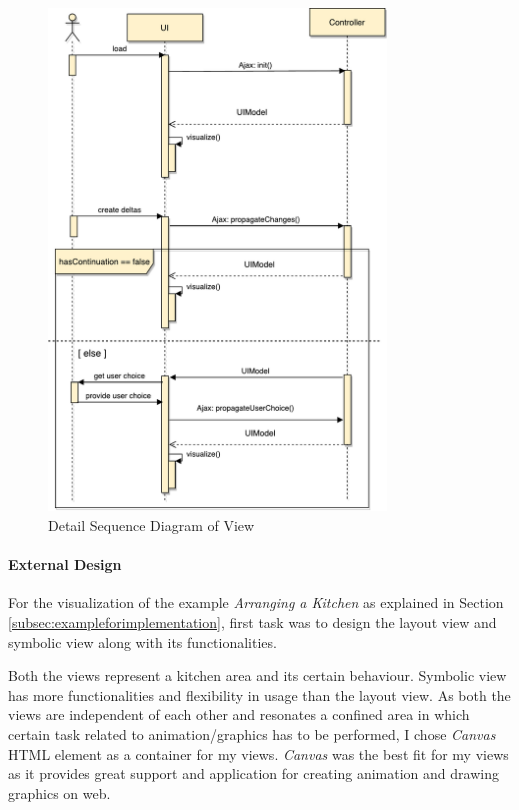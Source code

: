 \begin{figure}
	\includegraphics[width=0.8\textwidth]{figures/Sequence_Diagram-View}
	\caption{Detail Sequence Diagram of View}
	\label{fig:Sequence_Diagram-View}
\end{figure}

\paragraph{External Design}
For the visualization of the example \textit{Arranging a Kitchen} as explained in Section \ref{subsec:exampleforimplementation}, first task was to design the layout view and symbolic view along with its functionalities.

Both the views represent a kitchen area and its certain behaviour. Symbolic view has more functionalities and flexibility in usage than the layout view. As both the views are independent of each other and resonates a confined area in which certain task related to animation/graphics has to be performed, I chose \textit{Canvas} \cite{canvas} HTML element as a container for my views. \textit{Canvas} was the best fit for my views as it provides great support and application for creating animation and drawing graphics on web.

